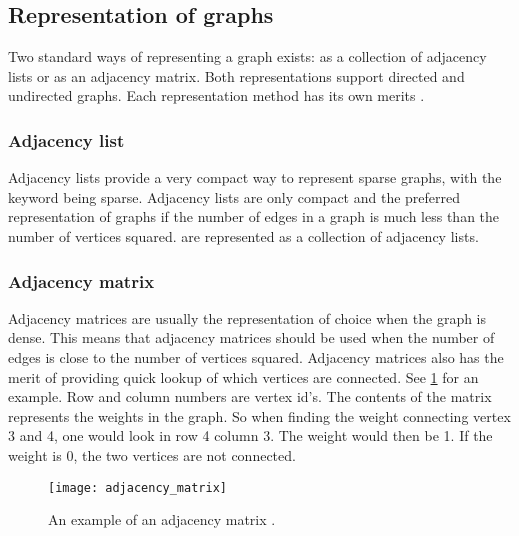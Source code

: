 

\subsection{Representation of graphs}

Two standard ways of representing a graph exists: as a collection of adjacency lists or as an adjacency matrix. Both representations support directed and undirected graphs. Each representation method has its own merits \cite{Cormen2009}.

\subsubsection{Adjacency list}
Adjacency lists provide a very compact way to represent sparse graphs, with the keyword being sparse. Adjacency lists are only compact and the preferred representation of graphs if the number of edges in a graph is much less than the number of vertices squared.  are represented as a collection of adjacency lists.

\subsubsection{Adjacency matrix}
Adjacency matrices are usually the representation of choice when the graph is dense. This means that adjacency matrices should be used when the number of edges is close to the number of vertices squared. Adjacency matrices also has the merit of providing quick lookup of which vertices are connected. See \cref{fig:adjacency_matrix} for an example. Row and column numbers are vertex id's. The contents of the matrix represents the weights in the graph. So when finding the weight connecting vertex 3 and 4, one would look in row 4 column 3. The weight would then be 1. If the weight is 0, the two vertices are not connected.

\begin{figure}[ht!]
    \centering
    \texttt{[image: adjacency\_matrix]}
    \caption{An example of an adjacency matrix \cite{Cormen2009}.}
    \label{fig:adjacency_matrix}
  \end{figure}